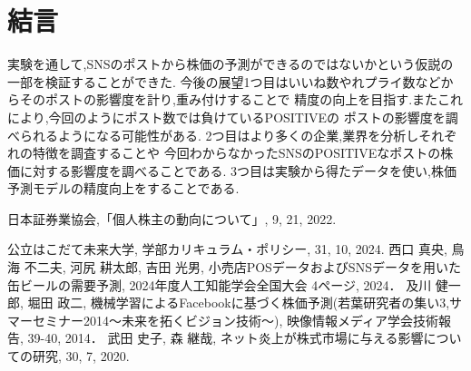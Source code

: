 \documentclass[11pt]{jarticle}
\begin{document}
\section{結言}
実験を通して,SNSのポストから株価の予測ができるのではないかという仮説の一部を検証することができた.
今後の展望1つ目はいいね数やれプライ数などからそのポストの影響度を計り,重み付けすることで
精度の向上を目指す.またこれにより,今回のようにポスト数では負けているPOSITIVEの
ポストの影響度を調べられるようになる可能性がある.
2つ目はより多くの企業,業界を分析しそれぞれの特徴を調査することや
今回わからなかったSNSのPOSITIVEなポストの株価に対する影響度を調べることである.
3つ目は実験から得たデータを使い,株価予測モデルの精度向上をすることである.
\begin{thebibliography}{99}
	日本証券業協会,「個人株主の動向について」,  9, 21, 2022.

	公立はこだて未来大学,	学部カリキュラム・ポリシー,  31, 10, 2024.
	西口 真央, 鳥海 不二夫, 河尻 耕太郎, 吉田 光男, 
	小売店POSデータおよびSNSデータを用いた缶ビールの需要予測, 2024年度人工知能学会全国大会 4ページ, 2024．
	及川 健一郎, 堀田 政二, 
	機械学習によるFacebookに基づく株価予測(若葉研究者の集い3,サマーセミナー2014～未来を拓くビジョン技術～), 映像情報メディア学会技術報告, 39-40, 2014．
	武田 史子, 森 継哉, ネット炎上が株式市場に与える影響についての研究, 30, 7, 2020.

\end{thebibliography}
\end{document}
